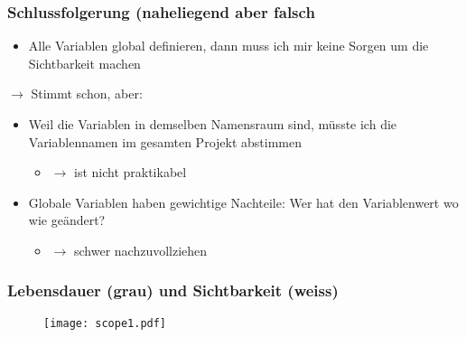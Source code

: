 \subsubsection{Schlussfolgerung (naheliegend aber falsch\hfill}
\label{sec:unterunterabschnitt}
\begin{itemize}
	\item Alle Variablen global definieren, dann muss ich mir keine Sorgen um die Sichtbarkeit machen
\end{itemize}
$\rightarrow$ Stimmt schon, aber:
\begin{itemize}
	\item Weil die Variablen in demselben Namensraum sind, müsste ich die Variablennamen im gesamten Projekt abstimmen
	\begin{itemize}
		\item[\-] $\rightarrow$ ist nicht praktikabel
	\end{itemize}
	\item Globale Variablen haben gewichtige Nachteile: Wer hat den Variablenwert wo wie geändert?
	\begin{itemize}
		\item[\-] $\rightarrow$ schwer nachzuvollziehen
	\end{itemize}
\end{itemize}

\subsubsection{Lebensdauer (grau) und Sichtbarkeit (weiss)}
\label{sec:unterunterabschnitt}
\noindent
\begin{figure}[hh]
	\centering
	\texttt{[image: scope1.pdf]}
\end{figure}

